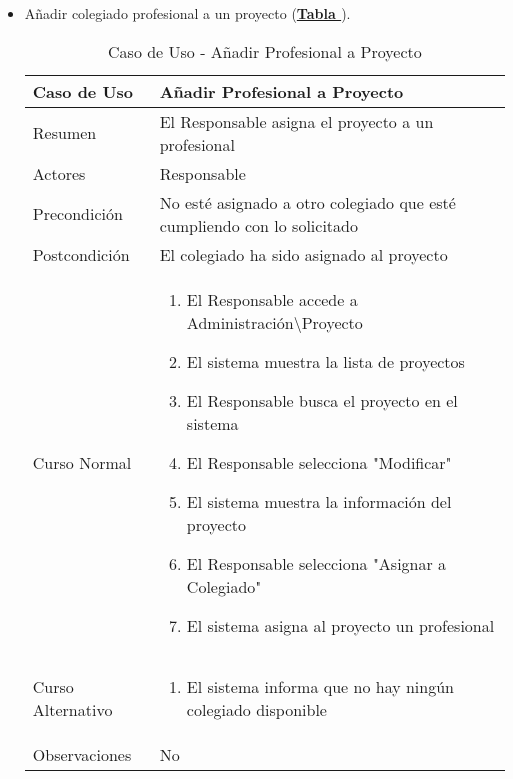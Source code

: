\begin{itemize}
	\item \addtocounter{tabla}{1} Añadir colegiado profesional a un proyecto (\textbf{\hyperref[tab:curAsignarProfProyecto]{Tabla }}). 
		\begin{table}[!htbp]
		  \centering  \addtocounter{casouso}{1}
		  \begin{tabular}{|l | p{100mm}|}
		    \textbf{Caso de Uso}  & \textbf{Añadir Profesional a Proyecto} \\ \hline
		    Resumen 		 & El Responsable asigna el proyecto a un profesional \\ \hline
		    Actores  		 & Responsable \\ \hline
		    Precondición  	 & No esté asignado a otro colegiado que esté cumpliendo con lo solicitado  \\ \hline
		    Postcondición  	 & El colegiado ha sido asignado al proyecto \\ \hline
		    Curso Normal   	 & \begin{enumerate}
		      \item El Responsable accede a Administración\textbackslash Proyecto
			  \item El sistema muestra la lista de proyectos
			  \item El Responsable busca el proyecto en el sistema
			  \item El Responsable selecciona "Modificar"
			  \item El sistema muestra la información del proyecto
			  \item El Responsable selecciona "Asignar a Colegiado"
			  \item El sistema asigna al proyecto un profesional
		    \end{enumerate}  \\ \hline
		    Curso Alternativo  & \begin{enumerate}
			  \item El sistema informa que no hay ningún colegiado disponible
		    \end{enumerate}  \\ \hline
		    Observaciones 	 & No  \\ \hline
		  \end{tabular}
		  \caption{Caso de Uso  - Añadir Profesional a Proyecto}
		  \label{tab:curAsignarProfProyecto}
		\end{table}
		\FloatBarrier
		

\end{itemize}
